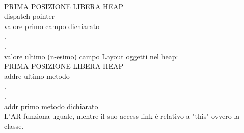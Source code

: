 \documentclass[12pt]{article}
\begin{document}
\vspace{2mm}
\\ PRIMA POSIZIONE LIBERA HEAP
\\ dispatch pointer
\\ valore primo campo dichiarato
\\ .
\\ .
\\ valore ultimo (n-esimo) campo
\vspace{5mm}
Layout oggetti nel heap: 
\vspace{2mm}
\\ PRIMA POSIZIONE LIBERA HEAP
\\ addre ultimo metodo
\\ .
\\ .
\\ addr primo metodo dichiarato
\vspace{2mm} 
\\ L'AR funziona uguale, mentre il suo access link è relativo a "this" ovvero la classe.
\end{document}

